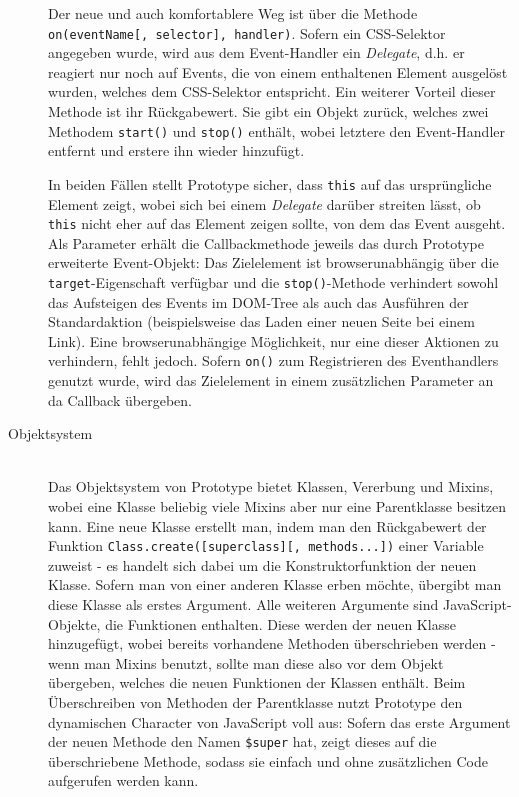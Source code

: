 \begin{description}
Der neue und auch komfortablere Weg ist über die Methode
\lstinline{on(eventName[, selector], handler)}. Sofern ein CSS-Selektor angegeben wurde,
wird aus dem Event-Handler ein \emph{Delegate}, d.h. er reagiert nur noch auf Events, die von einem
enthaltenen Element ausgelöst wurden, welches dem CSS-Selektor entspricht. Ein weiterer Vorteil
dieser Methode ist ihr Rückgabewert. Sie gibt ein Objekt zurück, welches zwei Methodem
\lstinline{start()} und \lstinline{stop()} enthält, wobei letztere den Event-Handler entfernt und
erstere ihn wieder hinzufügt.

In beiden Fällen stellt Prototype sicher, dass \lstinline{this} auf das ursprüngliche Element zeigt,
wobei sich bei einem \emph{Delegate} darüber streiten lässt, ob \lstinline{this} nicht eher auf das
Element zeigen sollte, von dem das Event ausgeht. Als Parameter erhält die Callbackmethode jeweils
das durch Prototype erweiterte Event-Objekt: Das Zielelement ist browserunabhängig über die
\lstinline{target}-Eigenschaft verfügbar und die \lstinline{stop()}-Methode verhindert sowohl das
Aufsteigen des Events im DOM-Tree als auch das Ausführen der Standardaktion (beispielsweise das
Laden einer neuen Seite bei einem Link). Eine browserunabhängige Möglichkeit, nur eine dieser
Aktionen zu verhindern, fehlt jedoch. Sofern \lstinline{on()} zum Registrieren des Eventhandlers
genutzt wurde, wird das Zielelement in einem zusätzlichen Parameter an da Callback übergeben.


\item[Objektsystem] \hfill \\
Das Objektsystem von Prototype bietet Klassen, Vererbung und Mixins, wobei eine Klasse beliebig
viele Mixins aber nur eine Parentklasse besitzen kann. Eine neue Klasse erstellt man, indem man den
Rückgabewert der Funktion \lstinline{Class.create([superclass][, methods...])} einer Variable
zuweist - es handelt sich dabei um die Konstruktorfunktion der neuen Klasse. Sofern man von einer
anderen Klasse erben möchte, übergibt man diese Klasse als erstes Argument. Alle weiteren Argumente
sind JavaScript-Objekte, die Funktionen enthalten. Diese werden der neuen Klasse hinzugefügt, wobei
bereits vorhandene Methoden überschrieben werden - wenn man Mixins benutzt, sollte man diese also
vor dem Objekt übergeben, welches die neuen Funktionen der Klassen enthält. Beim Überschreiben von
Methoden der Parentklasse nutzt Prototype den dynamischen Character von JavaScript voll aus: Sofern
das erste Argument der neuen Methode den Namen \lstinline{$super} hat, zeigt dieses auf die
überschriebene Methode, sodass sie einfach und ohne zusätzlichen Code aufgerufen werden kann.



\end{description}
